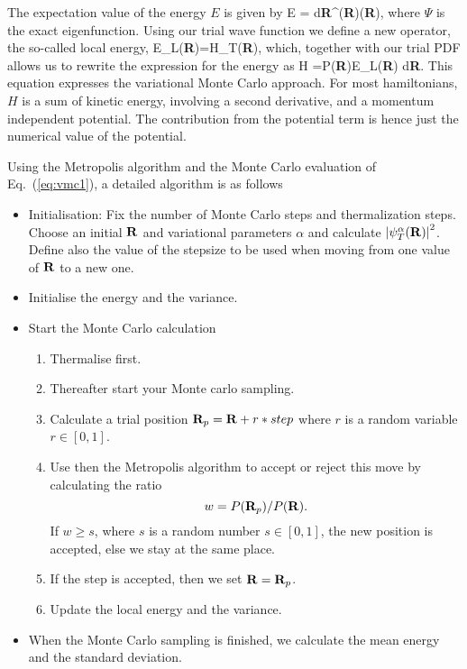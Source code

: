 The expectation value of the energy $E$
is given by
\be
   \langle E \rangle =
        {\int d{\bf R}\Psi^{\ast}({\bf R})\Psi({\bf R})},
\ee
where $\Psi$ is the exact eigenfunction. Using our trial
wave function we define a new operator, 
the so-called  
local energy, 
\be
   E_L({\bf R})=H\psi_T({\bf R}),
   \label{eq:locale1}
\ee
which, together with our trial PDF allows us to rewrite the 
expression for the energy as
\be
  \langle H \rangle =\int P({\bf R})E_L({\bf R}) d{\bf R}.
  \label{eq:vmc1}
\ee
This equation expresses the variational Monte Carlo approach.
For most hamiltonians, $H$ is a sum of kinetic energy, involving 
a second derivative, and a momentum independent potential. 
The contribution from the potential term is hence just the 
numerical value of the potential.

Using the Metropolis algorithm and the Monte Carlo 
evaluation of Eq.~(\ref{eq:vmc1}), a detailed algorithm is   
as follows
       \begin{itemize}
          \item Initialisation: Fix the number of Monte Carlo steps and 
                thermalization steps. Choose an initial ${\bf R}$ and
                variational parameters $\alpha$ and 
                calculate
                $\left|\psi_T^{\alpha}({\bf R})\right|^2$. 
                Define also the value 
                of the stepsize to be used when moving from one value of 
                ${\bf R}$ to a new one.
          \item Initialise the energy and the variance.
          \item Start the Monte Carlo calculation 
                \begin{enumerate}
                  \item Thermalise first.
                  \item Thereafter start your Monte carlo sampling.
                  \item Calculate  a trial position  ${\bf R}_p={\bf R}+r*step$
                        where $r$ is a random variable $r \in [0,1]$.
                  \item Use then the Metropolis algorithm to accept
                        or reject this move by calculating the ratio
                        \[
                           w = P({\bf R}_p)/P({\bf R}).
                        \]
                        If $w \ge s$, where $s$ is a random number
                          $s \in [0,1]$, 
                          the new position is accepted, else we 
                          stay at the same place.
                  \item If the step is accepted, then we set 
                        ${\bf R}={\bf R}_p$. 
                  \item Update the local energy and the variance.
                 \end{enumerate}
          \item When the Monte Carlo sampling is finished, 
we calculate the mean energy and the standard deviation.
      \end{itemize}


